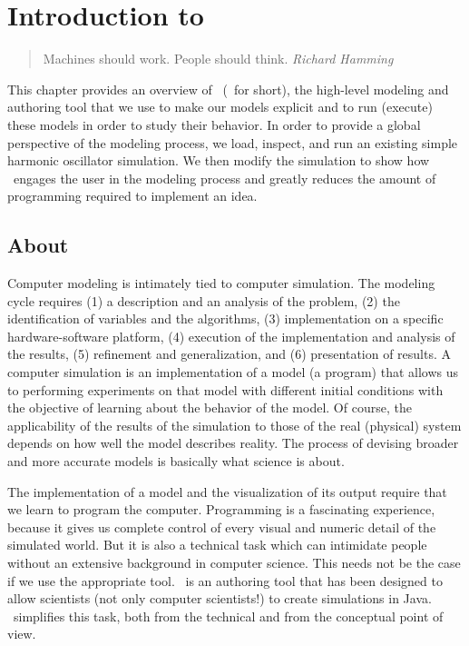 \chapter{Introduction to \Ejs}\label{chapter:EjsIntro}
\begin{quote}
Machines should work. People should think.  {\em Richard Hamming}
\end{quote}

This chapter provides an overview of \Ejs\ (\ejs\ for short), the high-level modeling and authoring tool that we use to make our models explicit and to run (execute) these models in order to study their behavior. In order to provide a
global perspective of the modeling process, we load, inspect, and run an existing simple harmonic oscillator
simulation. We then modify the simulation to show how \ejs\ engages the user in the modeling process and greatly
reduces the amount of programming required to implement an idea.

  \section{About \Ejs}

Computer modeling is intimately tied to computer simulation.  The modeling cycle requires (1) a description and an analysis of
the problem, (2) the identification of variables and the algorithms, (3) implementation on a specific hardware-software
platform, (4) execution of the implementation and analysis of the results, (5) refinement and generalization, and (6)
presentation of results. A computer simulation is an implementation of a model (a program) that allows us to performing experiments on that
model with different initial conditions with the objective of learning about the behavior of the
model. Of course, the applicability of the results of the simulation to those of the real (physical)
system depends on how well the model describes reality. The process of devising broader and
more accurate models is basically what science is about.

The implementation of a model and the visualization of its output require that we learn to program the computer. Programming is a fascinating experience, because it gives us complete control of every visual and numeric detail of the simulated world. But it is also a technical task which can intimidate people without an extensive background in computer science. This needs not be the case if we use the appropriate tool. \Ejs\ is an authoring tool that has been designed to allow scientists (not only computer scientists!) to create simulations in Java. \ejs\ simplifies this task, both from the technical and from the conceptual point of view.

